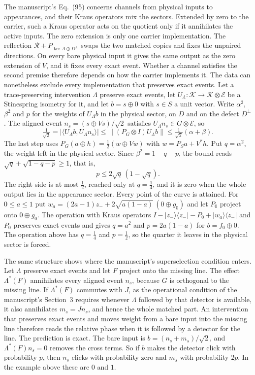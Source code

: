 \documentclass[11pt]{article}
\theoremstyle{remark}
\newcommand{\K}{\mathcal K}
\newcommand{\ket}[1]{\lvert #1\rangle}
\newcommand{\bra}[1]{\langle #1\rvert}
\begin{document}
The manuscript's Eq.~(95) concerns channels from physical inputs to appearances, and their Kraus operators mix the sectors. Extended by zero to the carrier, such a Kraus operator acts on the quotient only if it annihilates the active inputs. The zero extension is only one carrier implementation. The reflection $\mathcal R+P_{\ker A\oplus D^\perp}$ swaps the two matched copies and fixes the unpaired directions. On every bare physical input it gives the same output as the zero extension of $V$, and it fixes every exact event. Whether a channel satisfies the second premise therefore depends on how the carrier implements it. The data can nonetheless exclude every implementation that preserves exact events. Let a trace-preserving intervention $\Lambda$ preserve exact events, let $U_\Lambda:\K\to\K\otimes\mathcal E$ be a Stinespring isometry for it, and let $b=s\oplus0$ with $s\in S$ a unit vector. Write $\alpha^2$, $\beta^2$ and $p$ for the weights of $U_\Lambda b$ in the physical sector, on $D$ and on the defect $D^\perp$. The aligned event $n_s=(s\oplus Vs)/\sqrt2$ satisfies $U_\Lambda n_s\in G\otimes\mathcal E$, so
\[
 \tfrac1{\sqrt2}=|\langle U_\Lambda b,U_\Lambda n_s\rangle|\le\|(P_G\otimes I)U_\Lambda b\|\le\tfrac1{\sqrt2}(\alpha+\beta).
\]
The last step uses $P_G(a\oplus h)=\tfrac12(w\oplus Vw)$ with $w=P_Sa+V^*h$. Put $q=\alpha^2$, the weight left in the physical sector. Since $\beta^2=1-q-p$, the bound reads $\sqrt q+\sqrt{1-q-p}\ge1$, that is,
\[
 p\le2\sqrt q\,(1-\sqrt q).
\]
The right side is at most $\tfrac12$, reached only at $q=\tfrac14$, and it is zero when the whole output lies in the appearance sector. Every point of the curve is attained. For $0\le a\le1$ put $w_a=(2a-1)z_-+2\sqrt{a(1-a)}\,(0\oplus g_0)$ and let $P_0$ project onto $0\oplus g_0$. The operation with Kraus operators $I-\ket{z_-}\!\bra{z_-}-P_0+\ket{w_a}\!\bra{z_-}$ and $P_0$ preserves exact events and gives $q=a^2$ and $p=2a(1-a)$ for $b=f_0\oplus0$. The operation above has $q=\tfrac14$ and $p=\tfrac12$, so the quarter it leaves in the physical sector is forced.

The same structure shows where the manuscript's superselection condition enters. Let $\Lambda$ preserve exact events and let $F$ project onto the missing line. The effect $\Lambda^*(F)$ annihilates every aligned event $n_s$, because $G$ is orthogonal to the missing line. If $\Lambda^*(F)$ commutes with $J$, as the operational condition of the manuscript's Section~3 requires whenever $\Lambda$ followed by that detector is available, it also annihilates $m_s=Jn_s$, and hence the whole matched part. An intervention that preserves exact events and moves weight from a bare input into the missing line therefore reads the relative phase when it is followed by a detector for the line. The prediction is exact. The bare input is $b=(n_s+m_s)/\sqrt2$, and $\Lambda^*(F)n_s=0$ removes the cross terms. So if $b$ makes the detector click with probability $p$, then $n_s$ clicks with probability zero and $m_s$ with probability $2p$. In the example above these are $0$ and $1$.
\end{document}
